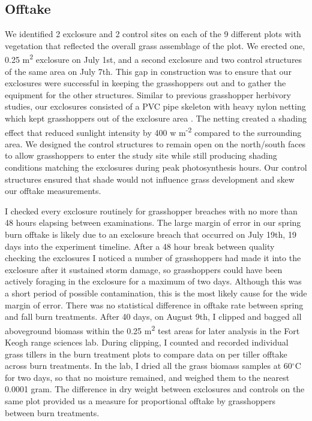 \documentclass[referee, 
	            sn-basic]
           {sn-jnl}
\begin{document}
\begin{linenumbers}
\hypertarget{offtake}{%
\subsection{Offtake}\label{offtake}}

We identified 2 exclosure and 2 control sites on each of the 9 different
plots with vegetation that reflected the overall grass assemblage of the
plot. We erected one, 0.25 m\textsuperscript{2} exclosure on July 1st,
and a second exclosure and two control structures of the same area on
July 7th. This gap in construction was to ensure that our exclosures
were successful in keeping the grasshoppers out and to gather the
equipment for the other structures. Similar to previous grasshopper
herbivory studies, our exclosures consisted of a PVC pipe skeleton with
heavy nylon netting which kept grasshoppers out of the exclosure area
\citep{parker1985}. The netting created a shading effect that reduced
sunlight intensity by 400 w m\textsuperscript{-2} compared to the
surrounding area. We designed the control structures to remain open on
the north/south faces to allow grasshoppers to enter the study site
while still producing shading conditions matching the exclosures during
peak photosynthesis hours. Our control structures ensured that shade
would not influence grass development and skew our offtake measurements.

I checked every exclosure routinely for grasshopper breaches with no
more than 48 hours elapsing between examinations. The large margin of
error in our spring burn offtake is likely due to an exclosure breach
that occurred on July 19th, 19 days into the experiment timeline. After
a 48 hour break between quality checking the exclosures I noticed a
number of grasshoppers had made it into the exclosure after it sustained
storm damage, so grasshoppers could have been actively foraging in the
exclosure for a maximum of two days. Although this was a short period of
possible contamination, this is the most likely cause for the wide
margin of error. There was no statistical difference in offtake rate
between spring and fall burn treatments. After 40 days, on August 9th, I
clipped and bagged all aboveground biomass within the 0.25
m\textsuperscript{2} test areas for later analysis in the Fort Keogh
range sciences lab. During clipping, I counted and recorded individual
grass tillers in the burn treatment plots to compare data on per tiller
offtake across burn treatments. In the lab, I dried all the grass
biomass samples at 60\(^\circ\)C for two days, so that no moisture
remained, and weighed them to the nearest 0.0001 gram. The difference in
dry weight between exclosures and controls on the same plot provided us
a measure for proportional offtake by grasshoppers between burn
treatments.


\end{linenumbers}
\end{document}
